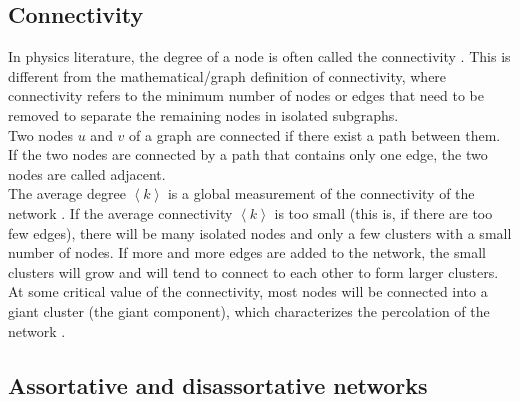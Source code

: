 \documentclass[11 pt , letterpaper , twoside , openright]{book}
\begin{document}
\subsection{Connectivity}
In physics literature, the degree of a node is often called the connectivity \cite{F.Costa2007}\cite{Mendes2002}. This is different from the mathematical/graph definition of connectivity, where connectivity refers to the minimum number of nodes or edges that need to be removed to separate the remaining nodes in isolated subgraphs.\\
Two nodes $u$ and $v$ of a graph are connected if there exist a path between them. If the two nodes are connected by a path that contains only one edge, the two nodes are called adjacent.\\
The average degree $\left<k\right>$ is a global measurement of the connectivity of the network \cite{Costa2008}. If the average connectivity $\left<k\right>$ is too small (this is, if there are too few edges), there will be many isolated nodes and only a few clusters with a small number of nodes. If more and more edges are added to the network, the small clusters will grow and will tend to connect to each other to form larger clusters. At some critical value of the connectivity, most nodes will be connected into a giant cluster (the giant component), which characterizes the percolation of the network \cite{F.Costa2007}.

\subsection{Assortative and disassortative networks}
\end{document}
